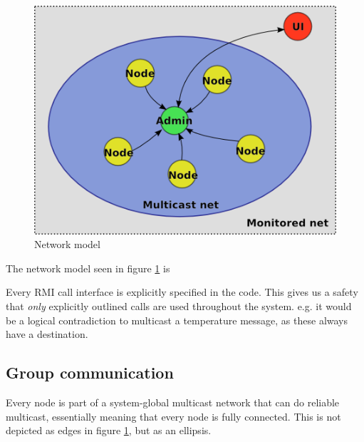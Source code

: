 \documentclass[10pt,a4paper]{article}
\begin{document}
\begin{figure}[h]
\centering
\includegraphics[scale=0.65]{fig/Networkmodel.png}
 \caption{Network model}
 \label{fig:network_model}
\end{figure}

The network model seen in figure \ref{fig:network_model} is 


Every RMI call interface is explicitly specified in the code. This gives us a safety that \emph{only} explicitly outlined calls are used throughout the system. e.g. it would be a logical contradiction to multicast a temperature message, as these always have a destination.

\subsection{Group communication}
Every node is part of a system-global multicast network that can do reliable multicast, essentially meaning that every node is fully connected. This is not depicted as edges in figure \ref{fig:network_model}, but as an ellipsis.
\end{document}
